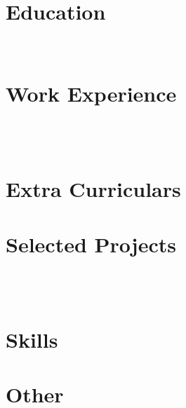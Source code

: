 \documentclass[a4paper,11pt]{article}
\begin{document}
\pagestyle{empty}



\section{Education}
 \\[-18pt]

\section{Work Experience}
 \\[5pt]
  \\[5pt]

% 
% 


\section{Extra Curriculars}



\section{Selected Projects}
 \\[5pt]
 \\[5pt]

% 

% 
% 
% 
% 
%

\section{Skills}


\section{Other}

\end{document}
